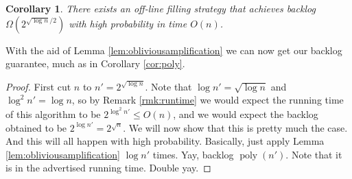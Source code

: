 \documentclass{article}[11pt]
\DeclareMathOperator{\poly}{\text{poly}}
\newtheorem{corollary}{Corollary}
\begin{document}
\begin{corollary}
  \label{cor:randalmostpoly}
  There exists an off-line filling strategy that achieves backlog
  $\Omega(2^{\sqrt{\log n}/2})$ with high probability in time $O(n)$.
\end{corollary}

With the aid of Lemma \ref{lem:obliviousamplification} we can now get our
backlog guarantee, much as in Corollary \ref{cor:poly}.
\begin{proof}%
  First cut $n$ to $n' =2^{\sqrt{\log n}}$. Note that $\log n' = \sqrt{\log n}$
  and $\log^2 n' = \log n$, so by Remark \ref{rmk:runtime} we would expect the
  running time of this algorithm to be $2^{\log^2 n'} \le O(n)$, and we would
  expect the backlog obtained to be $2^{\log n'} = 2^{\sqrt{n}}$. We will now
  show that this is pretty much the case. And this will all happen with high
  probability.
  Basically, just apply Lemma \ref{lem:obliviousamplification} $\log n'$ times.
  Yay, backlog $\poly(n')$. Note that it is in the advertised running time.
  Double yay.
 
\end{proof}
\end{document}
